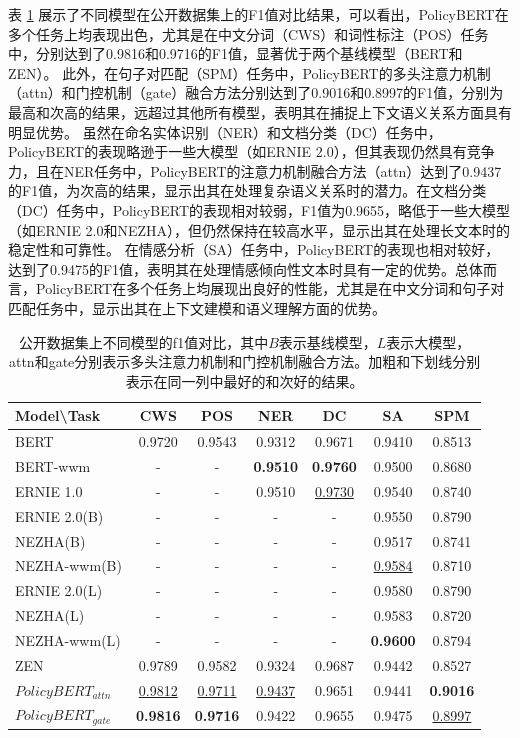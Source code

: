 \documentclass[12pt, a4paper]{ctexart}
\begin{document}
表 \ref{tab:public_results} 展示了不同模型在公开数据集上的F1值对比结果，可以看出，PolicyBERT在多个任务上均表现出色，尤其是在中文分词（CWS）和词性标注（POS）任务中，分别达到了0.9816和0.9716的F1值，显著优于两个基线模型（BERT和ZEN）。
此外，在句子对匹配（SPM）任务中，PolicyBERT的多头注意力机制（attn）和门控机制（gate）融合方法分别达到了0.9016和0.8997的F1值，分别为最高和次高的结果，远超过其他所有模型，表明其在捕捉上下文语义关系方面具有明显优势。
虽然在命名实体识别（NER）和文档分类（DC）任务中，PolicyBERT的表现略逊于一些大模型（如ERNIE 2.0），但其表现仍然具有竞争力，且在NER任务中，PolicyBERT的注意力机制融合方法（attn）达到了0.9437的F1值，为次高的结果，显示出其在处理复杂语义关系时的潜力。在文档分类（DC）任务中，PolicyBERT的表现相对较弱，F1值为0.9655，略低于一些大模型（如ERNIE 2.0和NEZHA），但仍然保持在较高水平，显示出其在处理长文本时的稳定性和可靠性。
在情感分析（SA）任务中，PolicyBERT的表现也相对较好，达到了0.9475的F1值，表明其在处理情感倾向性文本时具有一定的优势。总体而言，PolicyBERT在多个任务上均展现出良好的性能，尤其是在中文分词和句子对匹配任务中，显示出其在上下文建模和语义理解方面的优势。

\begin{table}[H]
    \renewcommand{\arraystretch}{0.8}
    \centering
    \caption{公开数据集上不同模型的f1值对比，其中$B$表示基线模型，$L$表示大模型，attn和gate分别表示多头注意力机制和门控机制融合方法。加粗和下划线分别表示在同一列中最好的和次好的结果。}
    \begin{tabular}{lcccccc}
        \toprule
        \textbf{Model\textbackslash Task} & CWS & POS & NER & DC & SA & SPM \\
        \midrule
        BERT      & 0.9720 & 0.9543 & 0.9312 & 0.9671 & 0.9410 & 0.8513\\
        \midrule
        BERT-wwm     & - & - & \textbf{0.9510} & \textbf{0.9760} & 0.9500 & 0.8680\\
        ERNIE 1.0    & - & - & 0.9510 & \underline{0.9730} & 0.9540 & 0.8740 \\
        ERNIE 2.0(B) & - & - & -      & -      & 0.9550 & 0.8790\\
        NEZHA(B)     & - & - & -      & -      & 0.9517 & 0.8741\\
        NEZHA-wwm(B) & - & - & -      & -      & \underline{0.9584} & 0.8710\\
        \midrule
        ERNIE 2.0(L) & - & - & -      & -      & 0.9580 & 0.8790\\
        NEZHA(L)     & - & - & -      & -      & 0.9583 & 0.8720\\
        NEZHA-wwm(L) & - & - & -      & -      & \textbf{0.9600} & 0.8794\\
        \midrule
        ZEN       & 0.9789 & 0.9582 & 0.9324 & 0.9687 & 0.9442 & 0.8527\\
        \midrule
        $PolicyBERT_{attn}$ & \underline{0.9812} & \underline{0.9711} & \underline{0.9437} & 0.9651 & 0.9441 & \textbf{0.9016}\\
        $PolicyBERT_{gate}$ & \textbf{0.9816} & \textbf{0.9716} & 0.9422 & 0.9655 & 0.9475 & \underline{0.8997}\\ 
        \bottomrule
    \end{tabular}
    \label{tab:public_results} 
\end{table}
\end{document}
